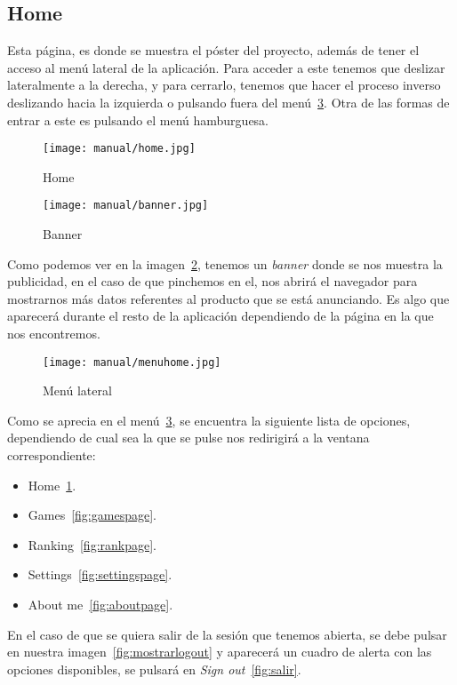 \subsection{Home}\label{home}
Esta página, es donde se muestra el póster del proyecto, además de tener el acceso al menú lateral de la aplicación. Para acceder a este tenemos que deslizar lateralmente a la derecha, y para cerrarlo, tenemos que hacer el proceso inverso deslizando hacia la izquierda o pulsando fuera del menú~\ref{fig:menuhome}. Otra de las formas de entrar a este es pulsando el menú hamburguesa.

\begin{figure}[H]
	\centering
	\texttt{[image: manual/home.jpg]}
	\caption{Home}\label{fig:homepage}
\end{figure}

\begin{figure}[H]
	\centering
	\texttt{[image: manual/banner.jpg]}
	\caption{Banner}\label{fig:banner}
\end{figure}

Como podemos ver en la imagen~\ref{fig:banner}, tenemos un \emph{banner} donde se nos muestra la publicidad, en el caso de que pinchemos en el, nos abrirá el navegador para mostrarnos más datos referentes al producto que se está anunciando. Es algo que aparecerá durante el resto de la aplicación dependiendo de la página en la que nos encontremos.

\begin{figure}[H]
	\centering
	\texttt{[image: manual/menuhome.jpg]}
	\caption{Menú lateral}\label{fig:menuhome}
\end{figure}
 
Como se aprecia en el menú~\ref{fig:menuhome},  se encuentra la siguiente lista de opciones, dependiendo de cual sea la que se pulse nos redirigirá a la ventana correspondiente:

\begin{itemize}
	\item Home~\ref{fig:homepage}.
	\item Games~\ref{fig:gamespage}.
	\item Ranking~\ref{fig:rankpage}.
	\item Settings~\ref{fig:settingspage}.
	\item About me~\ref{fig:aboutpage}.
\end{itemize}

En el caso de que se quiera salir de la sesión que tenemos abierta, se debe pulsar en nuestra imagen~\ref{fig:mostrarlogout} y aparecerá un cuadro de alerta con las opciones disponibles, se pulsará en \emph{Sign out}~\ref{fig:salir}.

